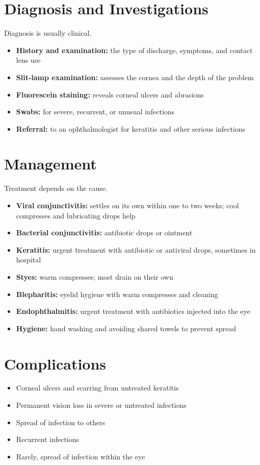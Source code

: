 \section*{Diagnosis and Investigations}
Diagnosis is usually clinical.
\begin{itemize}
    \item \textbf{History and examination:} the type of discharge, symptoms, and contact lens use
    \item \textbf{Slit-lamp examination:} assesses the cornea and the depth of the problem
    \item \textbf{Fluorescein staining:} reveals corneal ulcers and abrasions
    \item \textbf{Swabs:} for severe, recurrent, or unusual infections
    \item \textbf{Referral:} to an ophthalmologist for keratitis and other serious infections
\end{itemize}

\section*{Management}
Treatment depends on the cause.
\begin{itemize}
    \item \textbf{Viral conjunctivitis:} settles on its own within one to two weeks; cool compresses and lubricating drops help
    \item \textbf{Bacterial conjunctivitis:} antibiotic drops or ointment
    \item \textbf{Keratitis:} urgent treatment with antibiotic or antiviral drops, sometimes in hospital
    \item \textbf{Styes:} warm compresses; most drain on their own
    \item \textbf{Blepharitis:} eyelid hygiene with warm compresses and cleaning
    \item \textbf{Endophthalmitis:} urgent treatment with antibiotics injected into the eye
    \item \textbf{Hygiene:} hand washing and avoiding shared towels to prevent spread
\end{itemize}

\section*{Complications}
\begin{itemize}
    \item Corneal ulcers and scarring from untreated keratitis
    \item Permanent vision loss in severe or untreated infections
    \item Spread of infection to others
    \item Recurrent infections
    \item Rarely, spread of infection within the eye
\end{itemize}

